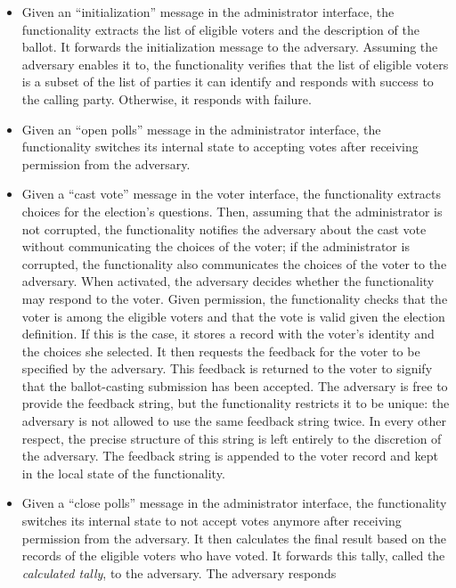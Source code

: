 \begin{itemize}
\item Given an ``initialization'' message in the administrator interface,
  the functionality extracts the list of eligible voters and the
  description of the ballot. It forwards the initialization message to
  the adversary. Assuming the adversary enables it to, the
  functionality verifies that the list of eligible voters is a subset
  of the list of parties it can identify and responds with success to
  the calling party. Otherwise, it responds with failure.
\item Given an ``open polls'' message in the administrator interface,
  the functionality switches its internal state to accepting votes
  after receiving permission from the adversary.
\item Given a ``cast vote'' message in the voter interface, the
  functionality extracts choices for the election's questions. Then,
  assuming that the administrator is not corrupted, the functionality
  notifies the adversary about the cast vote without communicating the
  choices of the voter; if the administrator is corrupted, the
  functionality also communicates the choices of the voter to the
  adversary. When activated, the adversary decides whether the
  functionality may respond to the voter. Given permission, the
  functionality checks that the voter is among the eligible voters and
  that the vote is valid given the election definition. If this is the
  case, it stores a record with the voter's identity and the choices
  she selected. It then requests the feedback for the voter to be
  specified by the adversary. This feedback is returned to the voter
  to signify that the ballot-casting submission has been accepted. The
  adversary is free to provide the feedback string, but the
  functionality restricts it to be unique: the adversary is not
  allowed to use the same feedback string twice. In every other
  respect, the precise structure of this string is left entirely to
  the discretion of the adversary. The feedback string is appended to
  the voter record and kept in the local state of the functionality.
\item Given a ``close polls'' message in the administrator interface,
  the functionality switches its internal state to not accept votes
  anymore after receiving permission from the adversary.  It then
  calculates the final result based on the records of the eligible
  voters who have voted. It forwards this tally, called the
  \emph{calculated tally}, to the adversary. The adversary responds

\end{itemize}
